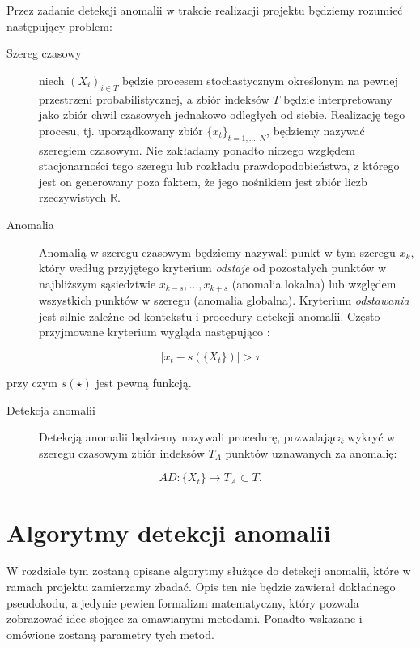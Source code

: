 \documentclass{article}
\begin{document}
Przez zadanie detekcji anomalii w trakcie realizacji projektu będziemy
rozumieć następujący problem:

\begin{description}
\item[Szereg czasowy]
niech \((X_{i})_{i \in T}\) będzie procesem stochastycznym określonym na
pewnej przestrzeni probabilistycznej, a zbiór indeksów \(T\) będzie
interpretowany jako zbiór chwil czasowych jednakowo odległych od siebie.
Realizację tego procesu, tj. uporządkowany zbiór
\(\{x{_t}\}_{t = 1, \dots, N}\), będziemy nazywać szeregiem czasowym.
Nie zakładamy ponadto niczego względem stacjonarności tego szeregu lub
rozkładu prawdopodobieństwa, z którego jest on generowany poza faktem,
że jego nośnikiem jest zbiór liczb rzeczywistych \(\mathbb{R}\).
\item[Anomalia]
Anomalią w szeregu czasowym będziemy nazywali punkt w tym szeregu
\(x_{k}\), który według przyjętego kryterium \emph{odstaje} od
pozostałych punktów w najbliższym sąsiedztwie
\(x_{k - s}, \dots, x_{k + s}\) (anomalia lokalna) lub względem
wszystkich punktów w szeregu (anomalia globalna). Kryterium
\emph{odstawania} jest silnie zależne od kontekstu i procedury detekcji
anomalii. Często przyjmowane kryterium wygląda następująco
\cite{ad_review}:
\end{description}


\begin{equation}
  \label{eq1}
  |x_t - s(\{X_{t}\})| > \tau
\end{equation}

przy czym \(s(\star)\) jest pewną funkcją.

\begin{description}
\item[Detekcja anomalii]
Detekcją anomalii będziemy nazywali procedurę, pozwalającą wykryć w
    szeregu czasowym zbiór indeksów $T_{A}$ punktów uznawanych za anomalię:
\end{description}

\begin{equation*}
AD\colon \{X_{t}\} \rightarrow T_{A} \subset T.
\end{equation*}

\section{Algorytmy detekcji anomalii \label{r4}}

W rozdziale tym zostaną opisane algorytmy służące do detekcji anomalii,
które w ramach projektu zamierzamy zbadać. Opis ten nie będzie zawierał
dokładnego pseudokodu, a jedynie pewien formalizm matematyczny, który
pozwala zobrazować idee stojące za omawianymi metodami. Ponadto wskazane
i omówione zostaną parametry tych metod.
\end{document}
